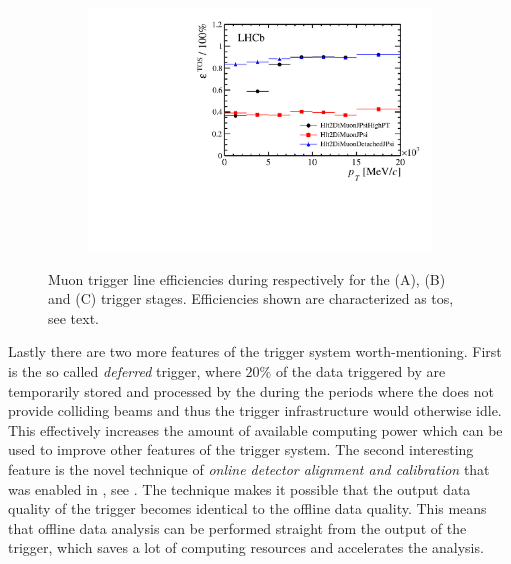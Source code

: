 \begin{figure}[t!]
\begin{subfigure}{0.5\textwidth}
    \includegraphics[width=\textwidth,trim=0.45cm 0cm 0.4cm 0cm, clip=true]{Figures/Chapter2/hlt2_muon_eff}
    \caption{}
    \label{det_run_one_hlt2_muon_line_eff}
  \end{subfigure}
  \caption{Muon trigger line efficiencies during \runone respectively for the \lzero (A), \hltone (B) and \hlttwo (C) trigger stages.
           Efficiencies shown are characterized as tos, see text.}
  \label{det_run_one_muon_line_eff}
\end{figure}

Lastly there are two more features of the \lhcb trigger system worth-mentioning. First is the so called
{\it deferred} trigger, where $20\%$ of the data triggered by \lzero are temporarily stored and processed by the \hlt
during the periods where the \lhc does not provide colliding beams and thus the \lhcb trigger infrastructure
would otherwise idle. This effectively increases the amount of available computing power which can be used
to improve other features of the trigger system. The second interesting feature is the novel technique of
{\it online detector alignment and calibration} that was enabled in \runtwo, see \cite{Aaij:2016rxn}.
The technique makes it possible that the output data quality of the trigger becomes identical to the offline data quality.
This means that offline data analysis can be performed straight from the output of the trigger, which saves
a lot of computing resources and accelerates the analysis.
